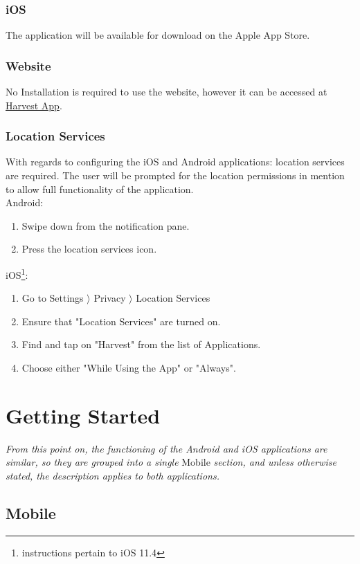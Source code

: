 \documentclass[11pt]{article}
\begin{document}
\subsubsection{iOS}
The application will be available for download on the Apple App Store.
\subsubsection{Website}
No Installation is required to use the website, however it can be accessed at \href{https://harvestapp.co.za}{Harvest App}.
\subsubsection{Location Services}
With regards to configuring the iOS and Android applications: location services are required. The user will be prompted for the location permissions in mention to allow full functionality of the application.\\
Android:
\begin{enumerate}
 \item Swipe down from the notification pane.
 \item Press the location services icon.
\end{enumerate}
iOS\footnote{instructions pertain to iOS 11.4}:
\begin{enumerate}
 \item Go to Settings $\rangle$ Privacy $\rangle$ Location Services
 \item Ensure that "Location Services" are turned on.
 \item Find and tap on "Harvest" from the list of Applications.
 \item Choose either "While Using the App" or "Always".
\end{enumerate}

\newpage
\section{Getting Started}
\textit{From this point on, the functioning of the Android and iOS applications are similar, so they are grouped into a single} Mobile \textit{section, and unless otherwise stated, the description applies to both applications.}

\subsection{Mobile}
\end{document}
